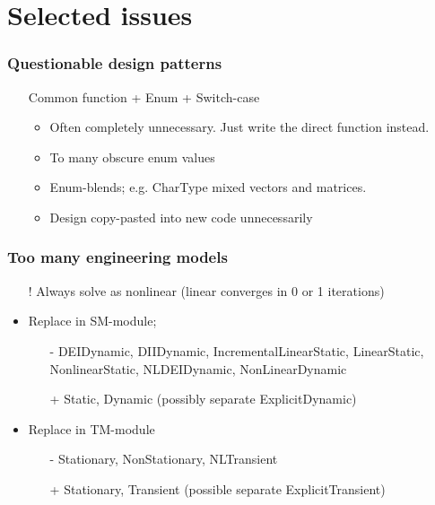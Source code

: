 \documentclass[11pt]{beamer} %
\begin{document}
\section{Selected issues}
\begin{frame}
 \frametitle{Questionable design patterns}
\begin{itemize}
 \item[\frownie] Common function + Enum + Switch-case
  \begin{itemize}
   \item Often completely unnecessary. Just write the direct function instead.
   \item To many obscure enum values
   \item Enum-blends; e.g. CharType mixed vectors and matrices.
   \item Design copy-pasted into new code unnecessarily
  \end{itemize}
\end{itemize}
\end{frame}


\begin{frame}
 \frametitle{Too many engineering models}
\begin{itemize}
 \item[!] Always solve as nonlinear (linear converges in 0 or 1 iterations)
 \item Replace in SM-module;
  \begin{itemize}
   \item[-] DEIDynamic, DIIDynamic, IncrementalLinearStatic, LinearStatic, NonlinearStatic, NLDEIDynamic, NonLinearDynamic
   \item[+] Static, Dynamic (possibly separate ExplicitDynamic)
  \end{itemize}
 \item Replace in TM-module
  \begin{itemize}
   \item[-] Stationary, NonStationary, NLTransient
   \item[+] Stationary, Transient (possible separate ExplicitTransient)
  \end{itemize}
\end{itemize}
\end{frame}
\end{document}
